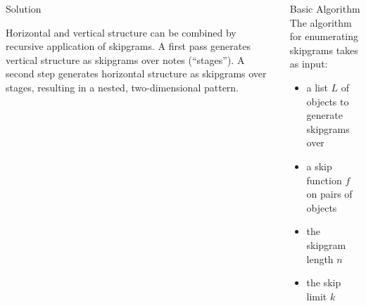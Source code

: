 \documentclass[final,cmyk]{beamer}
\newcommand*{\pianoroll}{
  \draw (0,2) rectangle (1,2.4);
  \draw (1,2.4) rectangle (2,2.8);
  \draw (2,2) rectangle (2.5,2.4);
  \draw (2.5,1.6) rectangle (3,2);
  \draw (3,1.2) rectangle (3.5,1.6);
  \draw (3.5,0.8) rectangle (4,1.2);
  
  \draw (4,1.6) rectangle (5,2);
  \draw (5,2) rectangle (6,2.4);
  \draw (6,1.6) rectangle (6.5,2);
  \draw (6.5,1.2) rectangle (7,1.6);
  \draw (7,0.8) rectangle (7.5,1.2);
  \draw (7.5,0.4) rectangle (8,0.8);
  
  \draw (1,-0.4) rectangle (2,0);
  \draw (2,0) rectangle (4,0.4);
  \draw (5,-0.8) rectangle (6,-0.4);
  \draw (6,-0.4) rectangle (8,0);
}
\begin{document}
\begin{frame}[t]
\begin{columns}[t]
\begin{column}{0.3\textwidth}
\begin{block}{Solution}
        \begin{adjustbox}{scale=2.7,center,margin=0 1ex}
        \end{adjustbox}
        
        Horizontal and vertical structure can be combined
        by \alert{recursive application of skipgrams}.
        A first pass generates vertical structure as skipgrams over notes (\enquote{stages}).
        A second step generates horizontal structure as skipgrams over stages,
        resulting in a nested, two-dimensional pattern.

        \begin{adjustbox}{scale=2.7,center,margin=0 1ex}
        \end{adjustbox}
      \end{block}
    \end{column}
    
    \begin{column}{0.3\textwidth}
      \begin{block}{Basic Algorithm}
        The algorithm for enumerating skipgrams takes as input:

        \begin{itemize}
        \item a list $L$ of objects to generate skipgrams over
        \item a skip function $f$ on pairs of objects
        \item the skipgram length $n$
        \item the skip limit $k$
        \end{itemize}


\end{block}
\end{column}
\end{columns}
\end{frame}
\end{document}
